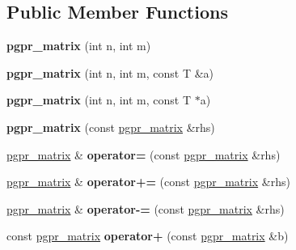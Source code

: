\subsection*{Public Member Functions}
\begin{DoxyCompactItemize}
\item 
\hypertarget{classpgpr__matrix_a2451b575fd88d47571f9999c0dc39e9a}{{\bfseries pgpr\+\_\+matrix} (int n, int m)}\label{classpgpr__matrix_a2451b575fd88d47571f9999c0dc39e9a}

\item 
\hypertarget{classpgpr__matrix_a243a5073f945175408af24ed5d0c340f}{{\bfseries pgpr\+\_\+matrix} (int n, int m, const T \&a)}\label{classpgpr__matrix_a243a5073f945175408af24ed5d0c340f}

\item 
\hypertarget{classpgpr__matrix_a2cb9bc3c0ebf48e5153b56dd9519b129}{{\bfseries pgpr\+\_\+matrix} (int n, int m, const T $\ast$a)}\label{classpgpr__matrix_a2cb9bc3c0ebf48e5153b56dd9519b129}

\item 
\hypertarget{classpgpr__matrix_a43770fb668583996c6301467754e1d55}{{\bfseries pgpr\+\_\+matrix} (const \hyperlink{classpgpr__matrix}{pgpr\+\_\+matrix} \&rhs)}\label{classpgpr__matrix_a43770fb668583996c6301467754e1d55}

\item 
\hypertarget{classpgpr__matrix_afe2e87219c7a853905244b8ce1f7c29e}{\hyperlink{classpgpr__matrix}{pgpr\+\_\+matrix} \& {\bfseries operator=} (const \hyperlink{classpgpr__matrix}{pgpr\+\_\+matrix} \&rhs)}\label{classpgpr__matrix_afe2e87219c7a853905244b8ce1f7c29e}

\item 
\hypertarget{classpgpr__matrix_a8ca215447bdb289128db27eb00b45625}{\hyperlink{classpgpr__matrix}{pgpr\+\_\+matrix} \& {\bfseries operator+=} (const \hyperlink{classpgpr__matrix}{pgpr\+\_\+matrix} \&rhs)}\label{classpgpr__matrix_a8ca215447bdb289128db27eb00b45625}

\item 
\hypertarget{classpgpr__matrix_ac6753573a8106255007b5e385382da68}{\hyperlink{classpgpr__matrix}{pgpr\+\_\+matrix} \& {\bfseries operator-\/=} (const \hyperlink{classpgpr__matrix}{pgpr\+\_\+matrix} \&rhs)}\label{classpgpr__matrix_ac6753573a8106255007b5e385382da68}

\item 
\hypertarget{classpgpr__matrix_ae01a5678548fcc25b73a7976cce88ac2}{const \hyperlink{classpgpr__matrix}{pgpr\+\_\+matrix} {\bfseries operator+} (const \hyperlink{classpgpr__matrix}{pgpr\+\_\+matrix} \&b)}\label{classpgpr__matrix_ae01a5678548fcc25b73a7976cce88ac2}


\end{DoxyCompactItemize}
